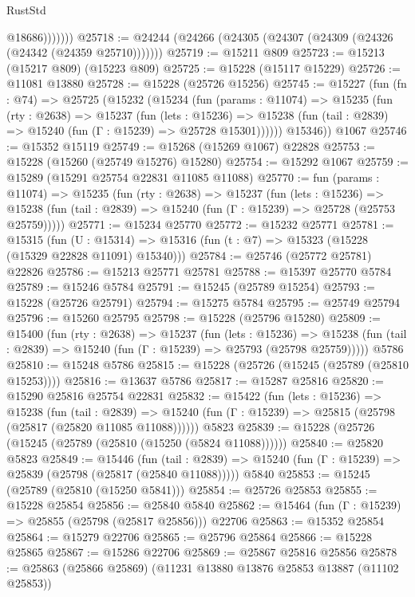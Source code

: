 \begin{lexlean}{RustStd}
\begin{coremodule}
                  @18686)))))))
@25718 := @24244 (@24266 (@24305 (@24307 (@24309 (@24326 (@24342 (@24359 @25710)))))))
@25719 := @15211 @809
@25723 := @15213 (@15217 @809) (@15223 @809)
@25725 := @15228 (@15117 @15229)
@25726 := @11081 @13880
@25728 := @15228 (@25726 @15256)
@25745 := @15227
    (fun (fn : @74) =>
    @25725
      (@15232
        (@15234
          (fun (params : @11074) =>
          @15235
            (fun (rty : @2638) =>
            @15237
              (fun (lets : @15236) =>
              @15238 (fun (tail : @2839) => @15240 (fun (Γ : @15239) => @25728 @15301))))))
        @15346))
    @1067
@25746 := @15352 @15119
@25749 := @15268 (@15269 @1067) @22828
@25753 := @15228 (@15260 (@25749 @15276) @15280)
@25754 := @15292 @1067
@25759 := @15289 (@15291 @25754 @22831 @11085 @11088)
@25770 := fun (params : @11074) =>
  @15235
    (fun (rty : @2638) =>
    @15237
      (fun (lets : @15236) =>
      @15238 (fun (tail : @2839) => @15240 (fun (Γ : @15239) => @25728 (@25753 @25759)))))
@25771 := @15234 @25770
@25772 := @15232 @25771
@25781 := @15315
    (fun (U : @15314) => @15316 (fun (t : @7) => @15323 (@15228 (@15329 @22828 @11091) @15340)))
@25784 := @25746 (@25772 @25781) @22826
@25786 := @15213 @25771 @25781
@25788 := @15397 @25770 @5784
@25789 := @15246 @5784
@25791 := @15245 (@25789 @15254)
@25793 := @15228 (@25726 @25791)
@25794 := @15275 @5784
@25795 := @25749 @25794
@25796 := @15260 @25795
@25798 := @15228 (@25796 @15280)
@25809 := @15400
    (fun (rty : @2638) =>
    @15237
      (fun (lets : @15236) =>
      @15238 (fun (tail : @2839) => @15240 (fun (Γ : @15239) => @25793 (@25798 @25759)))))
    @5786
@25810 := @15248 @5786
@25815 := @15228 (@25726 (@15245 (@25789 (@25810 @15253))))
@25816 := @13637 @5786
@25817 := @15287 @25816
@25820 := @15290 @25816 @25754 @22831
@25832 := @15422
    (fun (lets : @15236) =>
    @15238
      (fun (tail : @2839) =>
      @15240 (fun (Γ : @15239) => @25815 (@25798 (@25817 (@25820 @11085 @11088))))))
    @5823
@25839 := @15228 (@25726 (@15245 (@25789 (@25810 (@15250 (@5824 @11088))))))
@25840 := @25820 @5823
@25849 := @15446
    (fun (tail : @2839) => @15240 (fun (Γ : @15239) => @25839 (@25798 (@25817 (@25840 @11088)))))
    @5840
@25853 := @15245 (@25789 (@25810 (@15250 @5841)))
@25854 := @25726 @25853
@25855 := @15228 @25854
@25856 := @25840 @5840
@25862 := @15464 (fun (Γ : @15239) => @25855 (@25798 (@25817 @25856))) @22706
@25863 := @15352 @25854
@25864 := @15279 @22706
@25865 := @25796 @25864
@25866 := @15228 @25865
@25867 := @15286 @22706
@25869 := @25867 @25816 @25856
@25878 := @25863 (@25866 @25869) (@11231 @13880 @13876 @25853 @13887 (@11102 @25853))

\end{coremodule}
\end{lexlean}
